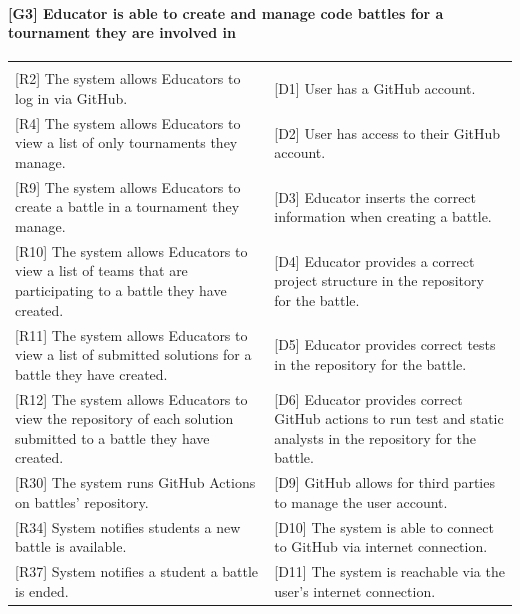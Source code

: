 \documentclass{article}
\begin{document}
\paragraph{[G3] Educator is able to create and manage code battles for a tournament they are involved in
}
\begin{center}
\begin{tabular}{|m{20em}|m{20em}|}
\hline
& \\
{[R2]} The system allows Educators to log in via GitHub. &
{[D1]} User has a GitHub account.\\
{[R4]} The system allows Educators to view a list of only tournaments they manage. &
{[D2]} User has access to their GitHub account.\\
{[R9]} The system allows Educators to create a battle in a tournament they manage. &
{[D3]} Educator inserts the correct information when creating a battle.\\
{[R10]} The system allows Educators to view a list of teams that are participating to a battle they have created. &
{[D4]} Educator provides a correct project structure in the repository for the battle.\\
{[R11]} The system allows Educators to view a list of submitted solutions for a battle they have created. &
{[D5]} Educator provides correct tests in the repository for the battle.\\
{[R12]} The system allows Educators to view the repository of each solution submitted to a battle they have created. &
{[D6]} Educator provides correct GitHub actions to run test and static analysts in the repository for the battle.\\
{[R30]} The system runs GitHub Actions on battles’ repository. &
{[D9]} GitHub allows for third parties to manage the user account.\\
{[R34]} System notifies students a new battle is available. &
{[D10]} The system is able to connect to GitHub via internet connection.\\
{[R37]} System notifies a student a battle is ended. &
{[D11]} The system is reachable via the user’s internet connection.\\
\hline
\end{tabular}
\end{center}
\end{document}
